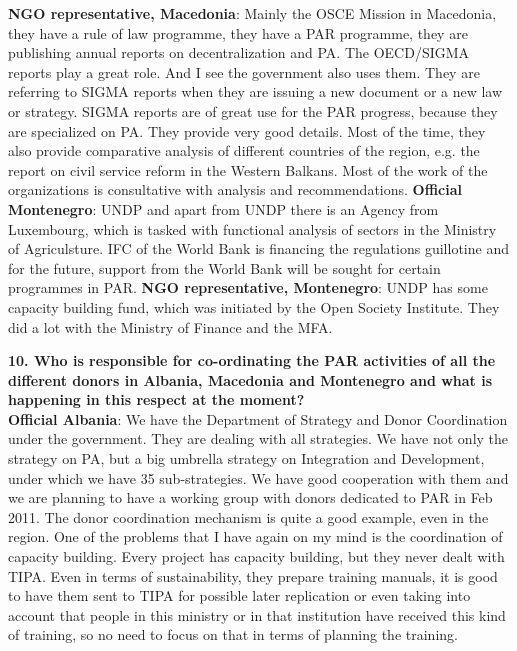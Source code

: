 \textbf{NGO representative, Macedonia}: Mainly the OSCE Mission in Macedonia, they have a rule of law programme, they have a PAR programme, they are publishing annual reports on decentralization and PA. The OECD/SIGMA reports play a great role. And I see the government also uses them. They are referring to SIGMA reports when they are issuing a new document or a new law or strategy. SIGMA reports are of great use for the PAR progress, because they are specialized on PA. They provide very good details. Most of the time, they also provide comparative analysis of different countries of the region, e.g. the report on civil service reform in the Western Balkans. Most of the work of the organizations is consultative with analysis and recommendations.
\textbf{Official Montenegro}: UNDP and apart from UNDP there is an Agency from Luxembourg, which is tasked with functional analysis of sectors in the Ministry of Agriculsture. IFC of the World Bank is financing the regulations guillotine and for the future, support from the World Bank will be sought for certain programmes in PAR.
\textbf{NGO representative, Montenegro}: UNDP has some capacity building fund, which was initiated by the Open Society Institute. They did a lot with the Ministry of Finance and the MFA.\newpage
\textbf{10. Who is responsible for co-ordinating the PAR activities of all the different donors in Albania, Macedonia and Montenegro and what is happening in this respect at the moment? }\\
\textbf{Official Albania}: We have the Department of Strategy and Donor Coordination under the government. They are dealing with all strategies. We have not only the strategy on PA, but a big umbrella strategy on Integration and Development, under which we have 35 sub-strategies. We have good cooperation with them and we are planning to have a working group with donors dedicated to PAR in Feb 2011. The donor coordination mechanism is quite a good example, even in the region. One of the problems that I have again on my mind is the coordination of capacity building. Every project has capacity building, but they never dealt with TIPA. Even in terms of sustainability, they prepare training manuals, it is good to have them sent to TIPA for possible later replication or even taking into account that people in this ministry or in that institution have received this kind of training, so no need to focus on that in terms of planning the training.
